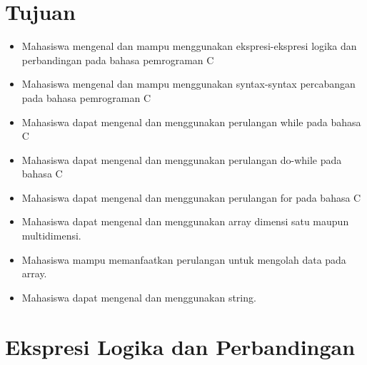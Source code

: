 \section{Tujuan}
\begin{itemize}[label=$\bullet$, itemsep=-1pt, leftmargin=*]
	\item Mahasiswa mengenal dan mampu menggunakan ekspresi-ekspresi logika dan perbandingan pada bahasa pemrograman C
	\item Mahasiswa mengenal dan mampu menggunakan syntax-syntax percabangan pada bahasa pemrograman C
	\item Mahasiswa dapat mengenal dan menggunakan perulangan while pada bahasa C
	\item Mahasiswa dapat mengenal dan menggunakan perulangan do-while pada bahasa C
	\item Mahasiswa dapat mengenal dan menggunakan perulangan for pada bahasa C
	\item Mahasiswa dapat mengenal dan menggunakan  array dimensi satu maupun multidimensi.
	\item Mahasiswa mampu memanfaatkan perulangan untuk mengolah data pada array.
	\item Mahasiswa  dapat mengenal dan menggunakan  string.
\end{itemize}
\section{Ekspresi Logika dan Perbandingan}

